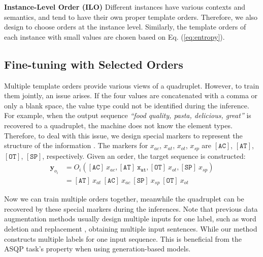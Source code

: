 \documentclass[11pt]{article}
\begin{document}
\vspace{6pt}
\noindent
\textbf{Instance-Level Order (ILO)} \; Different instances have various contexts and semantics, and tend to have their own proper template orders. Therefore, we also design to choose orders at the instance level. Similarly, the template orders of each instance with small values are chosen based on Eq. (\ref{eq:entropy}).






\subsection{Fine-tuning with Selected Orders}
Multiple template orders provide various views of a quadruplet. However, to train them jointly, an issue arises. If the four values are concatenated with a comma or only a blank space, the value type could not be identified during the inference. For example, when the output sequence \emph{``food quality, pasta, delicious, great''} is recovered to a quadruplet, the machine does not know the element types. Therefore, to deal with this issue, we design special markers to represent the structure of the information \cite{paolini2021structured}. The markers for $x_{ac}$, $x_{at}$, $x_{ot}$, $x_{sp}$ are $\mathtt{[AC]}$, $\mathtt{[AT]}$, $\mathtt{[OT]}$, $\mathtt{[SP]}$, respectively. Given an order, the target sequence is constructed:
\begin{equation*}
\begin{split}
    \bm{y}_{o_i}&=O_i(\mathtt{[AC]}\ x_{ac}, \mathtt{[AT]\ x_{at}}, \mathtt{[OT]}\ x_{ot}, \mathtt{[SP]}\ x_{sp}) \\
    &=\mathtt{[AT]}\ x_{at}\  \mathtt{[AC]}\ x_{ac}\  \mathtt{[SP]}\ x_{sp}\  \mathtt{[OT]}\ x_{ot}
\end{split}
\end{equation*}

Now we can train multiple orders together, meanwhile the quadruplet can be recovered by these special markers during the inferences. Note that previous data augmentation methods usually design multiple inputs for one label, such as word deletion and replacement \cite{gao2021simcse}, obtaining multiple input sentences. While our method constructs multiple labels for one input sequence. This is beneficial from the ASQP task's property when using generation-based models. 
\end{document}

